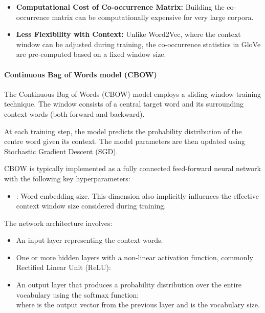\documentclass[
]{article}
\providecommand{\tightlist}{%
  \setlength{\itemsep}{0pt}\setlength{\parskip}{0pt}}
\begin{document}
\begin{itemize}
\tightlist
\item
  \textbf{Computational Cost of Co-occurrence Matrix:} Building the
  co-occurrence matrix can be computationally expensive for very large
  corpora.
\item
  \textbf{Less Flexibility with Context:} Unlike Word2Vec, where the
  context window can be adjusted during training, the co-occurrence
  statistics in GloVe are pre-computed based on a fixed window size.
\end{itemize}

\hypertarget{continuous-bag-of-words-model-cbow}{%
\paragraph{Continuous Bag of Words model
(CBOW)}\label{continuous-bag-of-words-model-cbow}}

The Continuous Bag of Words (CBOW) model employs a sliding window
training technique. The window consists of a central target word and its
surrounding context words (both forward and backward).

At each training step, the model predicts the probability distribution
of the centre word given its context. The model parameters are then
updated using Stochastic Gradient Descent (SGD).

CBOW is typically implemented as a fully connected feed-forward neural
network with the following key hyperparameters:

\begin{itemize}
\tightlist
\item
  {}: Word embedding size. This dimension also implicitly influences the
  effective context window size considered during training.
\end{itemize}

The network architecture involves:

\begin{itemize}
\tightlist
\item
  An input layer representing the context words.
\item
  One or more hidden layers with a non-linear activation function,
  commonly Rectified Linear Unit (ReLU):\\
  {}
\item
  An output layer that produces a probability distribution over the
  entire vocabulary using the softmax function:\\
  {}where {} is the output vector from the previous layer and {} is the
  vocabulary size.
\end{itemize}
\end{document}
